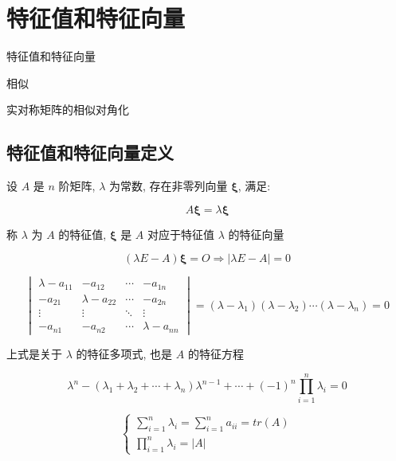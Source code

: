 
\chapter{特征值和特征向量}
\begin{introduction}
	\item 特征值和特征向量
	\item 相似
	\item 实对称矩阵的相似对角化
\end{introduction}
\section{特征值和特征向量定义}

\begin{definition}[特征值和特征向量]
	设 $A$ 是 $n$ 阶矩阵, $\lambda$ 为常数, 存在非零列向量 $\boldsymbol{\xi}$, 满足:  
	
	$$A\boldsymbol{\xi} = \lambda\boldsymbol{\xi}$$
	
	称 $\lambda$ 为 $A$ 的特征值, $\boldsymbol{\xi}$ 是 $A$ 对应于特征值 $\lambda$ 的特征向量
\end{definition}

\begin{corollary}[特征值]
	$$(\lambda E-A)\boldsymbol{\xi} = O \Rightarrow |\lambda E - A|=0$$
	
	$$\begin{vmatrix}
		\lambda - a_{11} & -a_{12}          & \cdots & -a_{1n}\\
		-a_{21}          & \lambda - a_{22} & \cdots & -a_{2n}\\
		\vdots           & \vdots           & \ddots & \vdots\\
		-a_{n1}          & -a_{n2}          & \cdots & \lambda - a_{nn}
	\end{vmatrix} = 
	(\lambda-\lambda_{1})(\lambda-\lambda_{2}) \cdots (\lambda-\lambda_{n}) = 0$$
	
	上式是关于 $\lambda$ 的特征多项式, 也是 $A$ 的特征方程  
	
	$$\lambda^{n}-(\lambda_{1}+\lambda_{2}+\cdots+\lambda_{n})\lambda^{n-1}+\cdots+(-1)^{n}\prod\limits_{i=1}^{n}\lambda_{i}=0$$
	  
	$$\begin{cases}
		\sum\limits_{i=1}^{n}\lambda_{i} = \sum\limits_{i=1}^{n}a_{ii} = tr(A)\\
		\prod\limits_{i=1}^{n}\lambda_{i} = |A|
	\end{cases}$$
\end{corollary}

